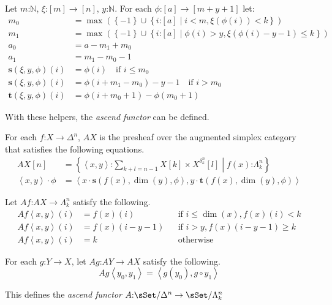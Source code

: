 \documentclass{tac}
\newcommand\hide[1]{}
\newcommand\of{\mathord:}
\newcommand\set[1]{\left\{#1\right\}}
\newcommand\nno{\mathbb N}
\newcommand\tuplet[1]{\left\langle{} #1 \right\rangle}
\begin{document}
\newcommand\source{\mathbf{s}}
\newcommand\target{\mathbf{t}}
Let \( m\of\nno \), \( \xi\of[m]\to[n] \), \( y\of \nno \). For each 
\( \phi\of[a]\to[m + y + 1] \) let:
\begin{align*}
  m_0 &= \max(\set{-1}\cup\set{i\of[a]\middle|i<m,\xi(\phi(i))<k})\\
  m_1 &= \max(\set{-1}\cup\set{i\of[a]\middle|\phi(i)>y,\xi(\phi(i)-y-1)\leq k})\\
  a_0 &= a - m_1 + m_0\\%
  a_1 &= m_1 - m_0 - 1\\
  \source(\xi, y, \phi)(i)&= \phi(i) \quad\textrm{if } i \leq m_0 \\
  \source(\xi, y, \phi)(i)&= \phi(i + m_1 - m_0) - y - 1 \quad\textrm{if } i > m_0 \\
  \target(\xi, y, \phi)(i) &= \phi(i + m_0 + 1) - \phi(m_0 + 1)
\end{align*}

With these helpers, the \emph{ascend functor} can be defined.
\begin{definition}
  For each \( f\of X\to \Delta^n \), \( AX \) is the presheaf over the augmented
  simplex category that satisfies the following equations.
  \begin{align*} 
    AX[n] &= \set{\tuplet{x,y}\of\sum_{k+l=n-1} X[k]\times X^{\delta^n_k}[l]\middle|f(x)\of \Lambda^n_k}\\
    \tuplet{x,y}\cdot\phi &= \tuplet{x\cdot\source(f(x),\dim(y),\phi), y\cdot\target(f(x),\dim(y),\phi)}
  \end{align*}

  Let \( Af\of AX\to \Lambda^n_k \) satisfy the following.
  \begin{align*}
    Af\tuplet{x,y}(i) &= f(x)(i) &&\textrm{if } i\leq\dim(x), f(x)(i)<k \\
    Af\tuplet{x,y}(i) &= f(x)(i-y-1)&&\textrm{if } i > y, f(x)(i-y-1)\geq k\\
    Af\tuplet{x,y}(i) &= k&&\textrm{otherwise}
  \end{align*}

  For each \( g\of Y\to X \), let \( Ag\of AY \to AX \) satisfy the following.
  \[  Ag\tuplet{y_0,y_1} = \tuplet{g(y_0),g\circ y_1}\]

  This defines the \emph{ascend functor} \(
    A\of \sSet/\Delta^n \to \sSet/\Lambda^n_k
  \)
\end{definition}

\hide{
  presheaf valued functor
  preserves acyclic cofibrations
  has right adjoint (which hence preserves fibrations)
  which is right inverse of reindexing
}
\end{document}
